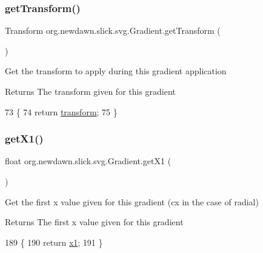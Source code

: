\subsubsection{\texorpdfstring{get\+Transform()}{getTransform()}}
{\footnotesize\ttfamily Transform org.\+newdawn.\+slick.\+svg.\+Gradient.\+get\+Transform (\begin{DoxyParamCaption}{ }\end{DoxyParamCaption})\hspace{0.3cm}{\ttfamily [inline]}}

Get the transform to apply during this gradient application

\begin{DoxyReturn}{Returns}
The transform given for this gradient 
\end{DoxyReturn}

\begin{DoxyCode}
73                                     \{
74         \textcolor{keywordflow}{return} \mbox{\hyperlink{classorg_1_1newdawn_1_1slick_1_1svg_1_1_gradient_a2ea5e518ebb63dd89e1613c7dcd40076}{transform}};
75     \}
\end{DoxyCode}
\mbox{\label{classorg_1_1newdawn_1_1slick_1_1svg_1_1_gradient_ae69b3be30a37c7efd9a4b63bbf7aba20}} 
\subsubsection{\texorpdfstring{get\+X1()}{getX1()}}
{\footnotesize\ttfamily float org.\+newdawn.\+slick.\+svg.\+Gradient.\+get\+X1 (\begin{DoxyParamCaption}{ }\end{DoxyParamCaption})\hspace{0.3cm}{\ttfamily [inline]}}

Get the first x value given for this gradient (cx in the case of radial)

\begin{DoxyReturn}{Returns}
The first x value given for this gradient 
\end{DoxyReturn}

\begin{DoxyCode}
189                          \{
190         \textcolor{keywordflow}{return} \mbox{\hyperlink{classorg_1_1newdawn_1_1slick_1_1svg_1_1_gradient_a3cd592974e65659efb2ae92a73420938}{x1}};
191     \}
\end{DoxyCode}
\mbox{\label{classorg_1_1newdawn_1_1slick_1_1svg_1_1_gradient_a13816e8cfa427ebfd0c328407eca151a}} 
